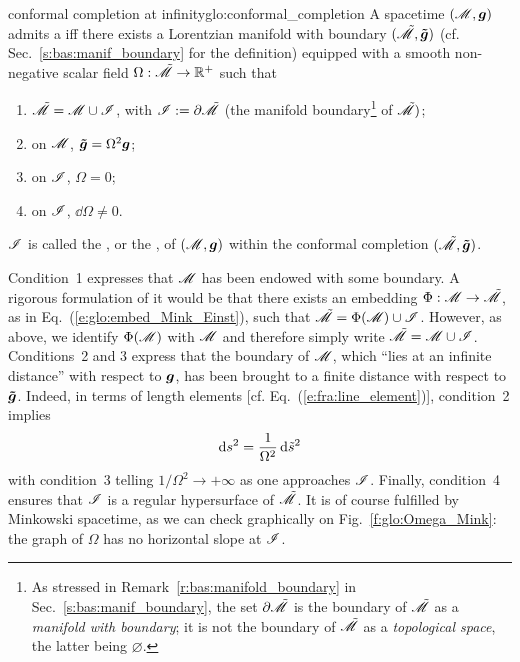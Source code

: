 \begin{tdef}{conformal completion at infinity}{glo:conformal_completion}
A spacetime $(\mathscr{M},\bm{g})$ admits a
iff there exists a Lorentzian manifold with boundary
$(\tilde{\mathscr{M}},\bm{\tilde{g}})$ (cf. Sec.~\ref{s:bas:manif_boundary} for the definition)
equipped with a smooth non-negative scalar field
$\Omega: \tilde{\mathscr{M}} \rightarrow \mathbb{R}^+$
such that
\begin{enumerate}
\item $\tilde{\mathscr{M}} = \mathscr{M} \cup \mathscr{I}$, with $\mathscr{I} := \partial \tilde{\mathscr{M}}$
(the manifold boundary\footnote{As stressed in Remark~\ref{r:bas:manifold_boundary}
in Sec.~\ref{s:bas:manif_boundary}, the set $\partial \tilde{\mathscr{M}}$ is
the boundary of $\tilde{\mathscr{M}}$ as a \emph{manifold with boundary}; it is not the boundary of
$\tilde{\mathscr{M}}$ as a \emph{topological space}, the latter being $\varnothing$.} of $\tilde{\mathscr{M}})$;
\item on $\mathscr{M}$, $\bm{\tilde{g}} = \Omega^2 \bm{g}$;
\item on $\mathscr{I}$, $\Omega=0$;
\item on $\mathscr{I}$, $\dd \Omega \not= 0$.
\end{enumerate}
$\mathscr{I}$ is called the ,
or the ,
of $(\mathscr{M},\bm{g})$ within
the conformal completion $(\tilde{\mathscr{M}},\bm{\tilde{g}})$.
\end{tdef}
Condition~1 expresses that $\mathscr{M}$ has been endowed with some boundary.
A rigorous formulation of it would be that there exists an
embedding $\Phi:\mathscr{M} \rightarrow \tilde{\mathscr{M}}$,
as in Eq.~(\ref{e:glo:embed_Mink_Einst}), such that
$\tilde{\mathscr{M}} = \Phi(\mathscr{M}) \cup \mathscr{I}$. However, as above, we identify $\Phi(\mathscr{M})$
with $\mathscr{M}$ and therefore simply write $\tilde{\mathscr{M}} = \mathscr{M} \cup \mathscr{I}$.
Conditions~2 and 3 express that the boundary of $\mathscr{M}$, which ``lies at an infinite
distance'' with respect to $\bm{g}$, has been brought to a
finite distance with respect to $\bm{\tilde{g}}$. Indeed, in terms of
length elements [cf. Eq.~(\ref{e:fra:line_element})], condition~2 implies
\[
    \mathrm{d} s^2 = \frac{1}{\Omega^2} \, \mathrm{d} {\tilde s}^2
\]
with condition~3 telling $1/\Omega^2 \rightarrow +\infty$ as one approaches $\mathscr{I}$.
Finally, condition~4 ensures
that $\mathscr{I}$ is a regular hypersurface of $\tilde{\mathscr{M}}$.
It is of course fulfilled by Minkowski spacetime, as we can check graphically
on Fig.~\ref{f:glo:Omega_Mink}: the graph of $\Omega$ has no horizontal slope
at $\mathscr{I}$.


